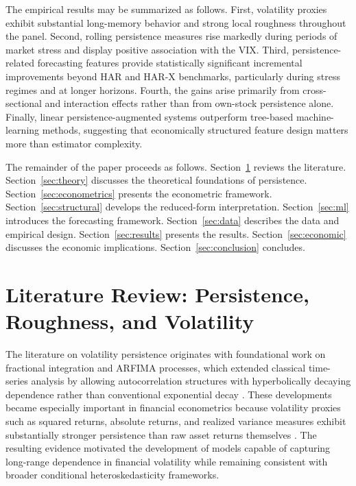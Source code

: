 \documentclass[unnumsec,webpdf,contemporary,large]{oup-authoring-template}%
\theoremstyle{thmstyleone}%
\theoremstyle{thmstyletwo}%
\theoremstyle{thmstylethree}%
\begin{document}
The empirical results may be summarized as follows. First, volatility
proxies exhibit substantial long-memory behavior and strong local roughness
throughout the panel. Second, rolling persistence measures rise markedly
during periods of market stress and display positive association with the
VIX. Third, persistence-related forecasting features provide statistically
significant incremental improvements beyond HAR and HAR-X benchmarks,
particularly during stress regimes and at longer horizons. Fourth, the gains
arise primarily from cross-sectional and interaction effects rather than
from own-stock persistence alone. Finally, linear persistence-augmented
systems outperform tree-based machine-learning methods, suggesting that
economically structured feature design matters more than estimator
complexity.

The remainder of the paper proceeds as follows. Section~\ref{sec:literature}
reviews the literature. Section~\ref{sec:theory} discusses the theoretical
foundations of persistence. Section~\ref{sec:econometrics} presents the
econometric framework. Section~\ref{sec:structural} develops the
reduced-form interpretation. Section~\ref{sec:ml} introduces the forecasting
framework. Section~\ref{sec:data} describes the data and empirical design.
Section~\ref{sec:results} presents the results. Section~\ref{sec:economic}
discusses the economic implications. Section~\ref{sec:conclusion} concludes.


\section{Literature Review: Persistence, Roughness, and Volatility}
\label{sec:literature}

The literature on volatility persistence originates with foundational work
on fractional integration and ARFIMA processes, which extended classical
time-series analysis by allowing autocorrelation structures with
hyperbolically decaying dependence rather than conventional exponential
decay \citep{granger1980introduction,hosking1981fractional}. These
developments became especially important in financial econometrics because
volatility proxies such as squared returns, absolute returns, and realized
variance measures exhibit substantially stronger persistence than raw asset
returns themselves \citep{ding1993long}. The resulting evidence motivated
the development of models capable of capturing long-range dependence in
financial volatility while remaining consistent with broader conditional
heteroskedasticity frameworks.
\end{document}
